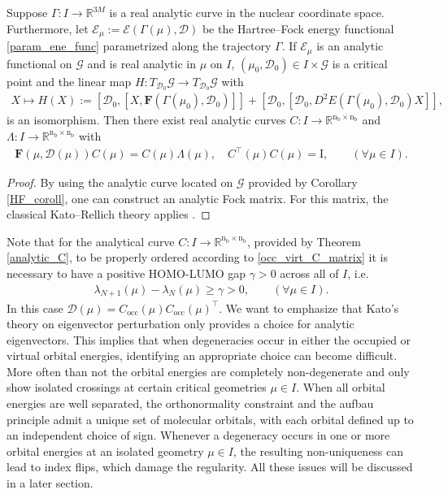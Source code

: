 \documentclass[reqno]{amsart}
\begin{document}
\begin{theorem}\label{analytic_C}
    Suppose $\Gamma:I\longrightarrow \mathbb{R}^{3M}$ is a real analytic curve in the nuclear coordinate space. Furthermore, let $\mathcal{E}_\mu:= \mathcal{E}(\Gamma(\mu),\mathscr{D})$ be the Hartree–Fock energy functional \eqref{param_ene_func} parametrized along the trajectory $\Gamma$. If $\mathcal{E}_\mu$ is an analytic functional on $\mathcal{G}$ and is real analytic in $\mu$ on $I$, $(\mu_0,\mathscr{D}_0)\in I\times \mathcal{G}$ is a critical point and the linear map
    $H:T_{\mathscr{D}_0}\mathcal{G}\longrightarrow T_{\mathscr{D}_0}\mathcal{G}$ with
    \begin{align}
        X\mapsto H(X):= [\mathscr{D}_0,[X,\mathbf{F}(\Gamma(\mu_0),\mathscr{D}_0)]]+[\mathscr{D}_0,[\mathscr{D}_0, D^2E(\Gamma(\mu_0),\mathscr{D}_0)X]],
    \end{align}
    is an isomorphism. Then there exist real analytic curves $C:I\longrightarrow \mathbb{R}^{\mathrm{n}_\mathrm{b}\times \mathrm{n}_\mathrm{b}}$ and $\Lambda:I\longrightarrow \mathbb{R}^{\mathrm{n}_\mathrm{b}\times \mathrm{n}_\mathrm{b}}$ with
    \begin{align}\label{param_dep_roothaan}
        \mathbf{F}(\mu,\mathscr{D}(\mu))C(\mu)=C(\mu)\Lambda(\mu), \quad C^\top(\mu) C(\mu)=\mathrm{I},\qquad(\forall \mu \in I).
    \end{align}
\end{theorem}
\begin{proof}
    By using the analytic curve located on $\mathcal{G}$ provided by Corollary \ref{HF_coroll}, one can construct an analytic Fock matrix. For this matrix, the classical Kato–Rellich theory applies \cite{rellich1969perturbation, Kato:1966:PTL}.
\end{proof}
Note that for the analytical curve $C:I\longrightarrow \mathbb{R}^{\text{n}_\text{b}\times \text{n}_\text{b}}$, provided by Theorem \ref{analytic_C}, to be properly ordered according to \eqref{occ_virt_C_matrix} it is necessary to have a positive HOMO-LUMO gap $\gamma>0$ across all of $I$, i.e.
\begin{align}
    \lambda_{N+1}(\mu)-\lambda_N(\mu)\ge \gamma >0, \qquad(\forall \mu\in I).
\end{align}
In this case $\mathscr{D}(\mu)=C_{\text{occ}}(\mu)C_{\text{occ}}(\mu)^\top$. We want to emphasize that Kato's theory on eigenvector perturbation only provides a choice for analytic eigenvectors. This implies that when degeneracies occur in either the occupied or virtual orbital energies, identifying an appropriate choice can become difficult. More often than not the orbital energies are completely non-degenerate and only show isolated crossings at certain critical geometries $\mu\in I$. When all orbital energies are well separated, the orthonormality constraint and the aufbau principle admit a unique set of molecular orbitals, with each orbital defined up to an independent choice of sign. Whenever a degeneracy occurs in one or more orbital energies at an isolated geometry $\mu\in I$, the resulting non-uniqueness can lead to index flips, which damage the regularity. All these issues will be discussed in a later section.\\
\end{document}
